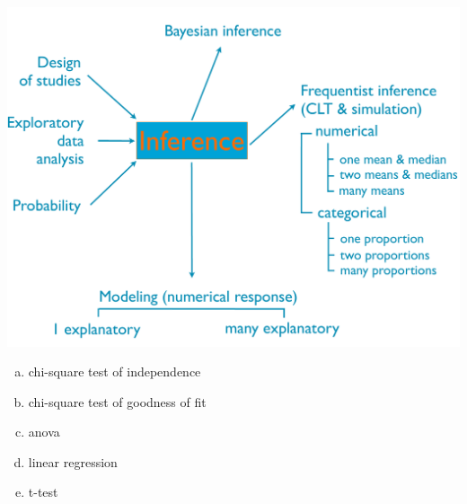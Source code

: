 \documentclass[slidestop,compress,mathserif,12pt,t,professionalfonts,xcolor=table]{beamer}
\newcommand{\solnMult}[1]{#1}
\begin{document}
\begin{frame}

{
{\scriptsize
{}}}
{
 \includegraphics[width=\textwidth]{figures/map/inference}
}

\begin{enumerate}[(a)]
\item chi-square test of independence
\item \solnMult{chi-square test of goodness of fit}
\item anova
\item linear regression
\item t-test
\end{enumerate}

\end{frame}

\end{document}
